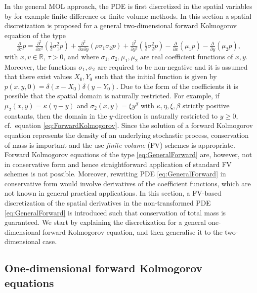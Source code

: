 \documentclass[10pt]{article}
\def\R{\mathbb{R}}
\begin{document}
In the general MOL approach, the PDE is first discretized in the spatial variables by for example finite difference or finite volume methods. In this section a spatial discretization is proposed for a general two-dimensional forward Kolmogorov equation of the type
\begin{equation}
\tfrac{\partial}{\partial \tau} p = \tfrac{\partial^{2}}{\partial x^{2}} \left(\tfrac{1}{2} \sigma_{1}^{2}p \right) + \tfrac{\partial^{2}}{\partial x \partial y} \left( \rho \sigma_{1} \sigma_{2} p \right) + \tfrac{\partial^{2}}{\partial y^{2}} \left(\tfrac{1}{2} \sigma_{2}^{2} p \right) - \tfrac{\partial}{\partial x} \left( \mu_{1} p \right) - \tfrac{\partial}{\partial y} \left( \mu_{2} p \right),
\label{eq:GeneralForward}
\end{equation}
with $x,v \in \R$, $\tau >0$, and where $\sigma_{1}, \sigma_{2}, \mu_{1}, \mu_{2}$ are real coefficient functions of $x, y$.
Moreover, the functions  $\sigma_{1}, \sigma_{2}$ are required to be non-negative and it is assumed that there exist values $X_{0}, Y_{0}$ such that the initial function is given by $p(x,y,0)=\delta(x-X_{0})\delta(y-Y_{0})$.
Due to the form of the coefficients it is possible that the spatial domain is naturally restricted. For example, if $\mu_{2}(x,y) = \kappa(\eta-y)$ and $\sigma_{2}(x,y) = \xi y^{\beta}$ with $\kappa, \eta, \xi, \beta$ strictly positive constants, then the domain in the $y$-direction is naturally restricted to $y \ge 0$, cf.\ equation \eqref{eq:ForwardKolmogorov}.
Since the solution of a forward Kolmogorov equation represents the density of an underlying stochastic process, conservation of mass is important and the use \textit{finite volume} (FV) schemes is appropriate. Forward Kolmogorov equations of the type \eqref{eq:GeneralForward} are, however, not in conservative form and hence straightforward application of standard FV schemes is not possible. Moreover, rewriting PDE \eqref{eq:GeneralForward} in conservative form would involve derivatives of the coefficient functions, which are not known in general practical applications. 
In this section, a FV-based discretization of the spatial derivatives in the non-transformed PDE \eqref{eq:GeneralForward} is introduced such that conservation of total mass is guaranteed.
We start by explaining the discretization for a general one-dimensional forward Kolmogorov equation, and then generalise it to the two-dimensional case.


\subsection{One-dimensional forward Kolmogorov equations} \label{1DKolmogorov}
\end{document}

